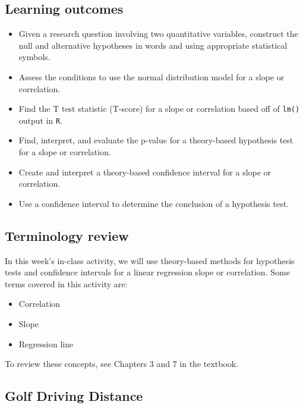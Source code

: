 \documentclass[
]{report}
\begin{document}

\hypertarget{learning-outcomes-8}{%
\subsection{Learning outcomes}\label{learning-outcomes-8}}

\begin{itemize}
\item
  Given a research question involving two quantitative variables, construct the null and alternative hypotheses
  in words and using appropriate statistical symbols.
\item
  Assess the conditions to use the normal distribution model for a slope or correlation.
\item
  Find the T test statistic (T-score) for a slope or correlation based off of \texttt{lm()} output in \texttt{R}.
\item
  Find, interpret, and evaluate the p-value for a theory-based hypothesis test for a slope or correlation.
\item
  Create and interpret a theory-based confidence interval for a slope or correlation.
\item
  Use a confidence interval to determine the conclusion of a hypothesis test.
\end{itemize}

\hypertarget{terminology-review-21}{%
\subsection{Terminology review}\label{terminology-review-21}}

In this week's in-class activity, we will use theory-based methods for hypothesis tests and confidence intervals for a linear regression slope or correlation. Some terms covered in this activity are:

\begin{itemize}
\item
  Correlation
\item
  Slope
\item
  Regression line
\end{itemize}

To review these concepts, see Chapters 3 and 7 in the textbook.

\hypertarget{golf-driving-distance}{%
\subsection{Golf Driving Distance}\label{golf-driving-distance}}
\end{document}
